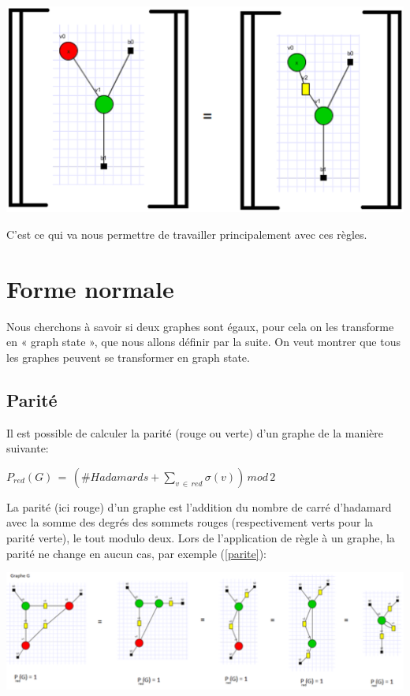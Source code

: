 \documentclass[a4paper,oneside]{book}
\begin{document}
\begin{center}
\includegraphics[scale=0.4]{IMG/pres2.eps}
\label{pres}
\end{center}

C'est ce qui va nous permettre de travailler principalement avec ces règles.

\section{Forme normale}
Nous cherchons à savoir si deux graphes sont égaux, pour cela on les transforme en « graph state », que nous allons définir par la suite. On veut montrer que tous les graphes peuvent se transformer en graph state.

\subsection{Parité}
Il est possible de calculer la parité (rouge ou verte) d'un graphe de la manière suivante:

\begin{center}
$P_{red}(G) \, = \,( \# Hadamards + \sum_{v \, \in \, red}^{}\sigma (v)) \, mod \, 2 $
\end{center}

La parité (ici rouge) d'un graphe est l'addition du nombre de carré d'hadamard avec la somme des degrés des sommets rouges (respectivement verts pour la parité verte), le tout modulo deux. Lors de l'application de règle à un graphe, la parité ne change en aucun cas, par exemple (\ref{parite}):

\hspace{-2.2cm}\includegraphics[scale=1]{IMG/parite.eps}
\label{parite}
\end{document}
